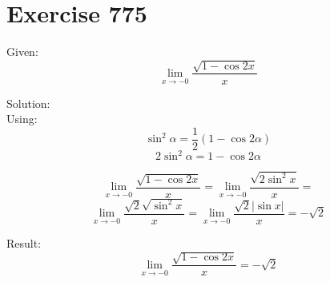 \documentclass[a4paper, 10pt]{scrartcl}
\begin{document}
\section{Exercise 775}

Given:
\[
\lim_{x\to -0}{\frac{\sqrt{1 - \cos{2x}}}{x}}
\]

Solution:\\

Using:
\[\sin^{2}{\alpha} = \frac{1}{2}(1 - \cos{2\alpha})\]
\[2\sin^{2}{\alpha} = 1 - \cos{2\alpha}\]

\[
\lim_{x\to -0}{\frac{\sqrt{1 - \cos{2x}}}{x}} = \lim_{x\to -0}{\frac{\sqrt{2\sin^{2}{x}}}{x}} =
\]
\[
\lim_{x\to -0}
{
    \frac
    {
        \sqrt{2}\sqrt{\sin^{2}{x}}
    }
    {
        x
    }
} =
\lim_{x\to -0}{\frac{\sqrt{2}\left|\sin{x}\right|}{x}} = -\sqrt{2}
\]

Result:
\[
\lim_{x\to -0}{\frac{\sqrt{1 - \cos{2x}}}{x}} = -\sqrt{2}
\]
\end{document}
